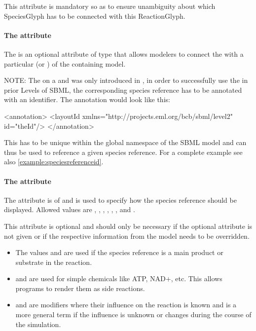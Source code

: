 This attribute is mandatory so as to ensure unambiguity about which SpeciesGlyph has to be connected with this ReactionGlyph. 


\paragraph{The  attribute}
The  is an optional attribute of type 
 that allows modelers to connect the \SpeciesReferenceGlyph with 
a particular \SpeciesReference (or \ModifierSpeciesReference) of the 
containing model. 

NOTE: The  on a \SpeciesReference and 
\ModifierSpeciesReference was only introduced in \sbmlthreecore, in 
order to successfully use the  in prior Levels 
of SBML, the corresponding species reference has to be annotated with an 
identifier. The annotation would look like this: 


\begin{example}
	<annotation>
		<layoutId xmlns="http://projects.eml.org/bcb/sbml/level2" id="theId"/>
	</annotation>
\end{example}

This  has to be unique within the global  namespace of the SBML model and can thus be used to reference a given species reference. For a complete example see also \ref{example:speciesreferenceid}. 


\paragraph{The  attribute}
\label{attribute:role}
The  attribute is of  and is 
used to specify how the species reference should be displayed. Allowed 
values are , , , 
, , , 
 and . 

This attribute is optional and should only be necessary if the optional 
 attribute is not given or if the respective 
information from the model needs to be overridden. 

\begin{itemize}

	\item { The values  and  are used if 
	the species reference is a main product or substrate in the reaction. } 
	\item {  and  are used for 
	simple chemicals like ATP, NAD+, etc. This allows programs to render 
	them as side reactions. } \item {  and 
	 are modifiers where their influence on the reaction is 
	known and  is a more general term if the influence is 
	unknown or changes during the course of the simulation. } 

\end{itemize}

